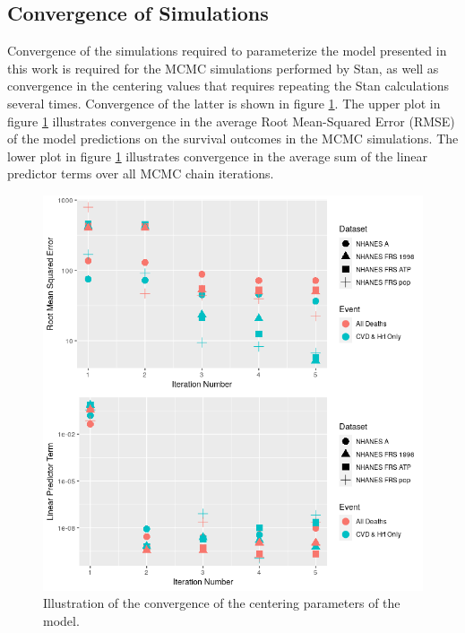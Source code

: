 \documentclass[
]{article}
\begin{document}
\subsection{Convergence of Simulations}\label{convergence-of-simulations}

Convergence of the simulations required to parameterize the model presented in this work is required for the MCMC simulations performed by Stan, as well as convergence in the centering values that requires repeating the Stan calculations several times. Convergence of the latter is shown in figure \ref{fig:linpred_conv}. The upper plot in figure \ref{fig:linpred_conv} illustrates convergence in the average Root Mean-Squared Error (RMSE) of the model predictions on the survival outcomes in the MCMC simulations. The lower plot in figure \ref{fig:linpred_conv} illustrates convergence in the average sum of the linear predictor terms over all MCMC chain iterations.

\begin{figure}
\centering
\includegraphics{./Rmarkdown_Plots/RMSE-Linpred_Convergence.png}
\caption{Illustration of the convergence of the centering parameters of the model.}\label{fig:linpred_conv}
\end{figure}
\end{document}

